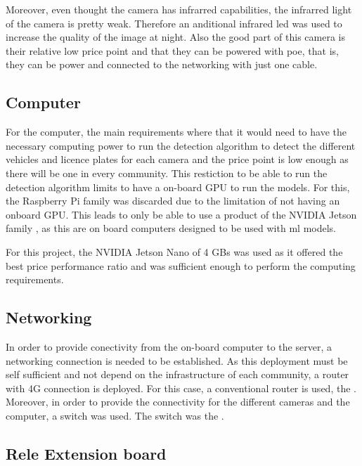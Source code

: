 Moreover, even thought the camera has infrarred capabilities, the infrarred light of the camera is pretty weak. Therefore an anditional infrared led was used to increase the quality of the image at night. Also the good part of this camera is their relative low price point and that they can be powered with \gls{poe}, that is, they can be power and connected to the networking with just one cable.


\subsection{Computer}

For the computer, the main requirements where that it would need to have the necessary computing power to run the detection algorithm to detect the different vehicles and licence plates for each camera and the price point is low enough as there will be one in every community. This restiction to be able to run the detection algorithm limits to have a on-board GPU to run the models. For this, the Raspberry Pi family \autocite{raspberrypi} was discarded due to the limitation of not having an onboard GPU. This leads to only be able to use a product of the NVIDIA Jetson family \autocite{nvidiaJetsonModules}, as this are on board computers designed to be used with \gls{ml} models.

For this project, the NVIDIA Jetson Nano of 4 GBs was used as it offered the best price performance ratio and was sufficient enough to perform the computing requirements.

\subsection{Networking}

In order to provide conectivity from the on-board computer to the server, a networking connection is needed to be established. As this deployment must be self sufficient and not depend on the infrastructure of each community, a router with 4G connection is deployed. For this case, a conventional router is used, the . Moreover, in order to provide the connectivity for the different cameras and the computer, a switch was used. The switch was the .


\subsection{Rele Extension board}

